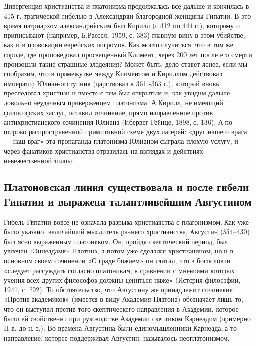 Дивергенция  христианства  и  платонизма  продолжалась  все  дальше  и
кончилась  в  415 г.  трагической  гибелью  в Александрии  благородной
женщины Гипатии. В это время  патриархом александрийским был Кирилл (с
412 по 444  г.), которому и приписывают (например,  Б.Рассел, 1959, с.
383)  главную вину  в  этом  убийстве, как  и  в провокации  еврейских
погромов. Как могло  случиться, что в том же  городе, где проповедовал
просвещенный  Климент,  через  200  лет  после  его  смерти  произошли
такие  страшные злодеяния?  Может  быть, дело  станет  яснее, если  мы
сообразим,  что в  промежутке  между Климентом  и Кириллом  действовал
император Юлиан-отступник  (царствовал в  361 -363 г.),  который вновь
преследовал христиан и вместе с тем был открытым и, как увидим дальше,
довольно  неудачным  приверженцем  платонизма. А  Кирилл,  не  имеющий
философских  заслуг,  оставил  сочинение,  прямо  направленное  против
антихристианского сочинения  Юлиана (Ибервег-Гейнце, 1898, с.  136). А
по  широко  распространенной  примитивной схеме  двух  лагерей:  «друг
нашего врага ---  наш враг» эта пропаганда  платонизма Юлианом сыграла
плохую услугу, и через фанатиков христианства отразилась на взглядах и
действиях невежественной толпы.

\subsection{Платоновская линия  существовала и после гибели  Гипатии и
выражена талантливейшим Августином}

Гибель Гипатии  вовсе не означала разрыва  христианства с платонизмом.
Как  уже  было  указано, величайший  мыслитель  раннего  христианства,
Августин  (354--430)  был  ясно   выраженным  платоником.  Он,  пройдя
скептический  период, был  увлечен  «Эннеадами» Плотина,  а потом  уже
сделался  христианином,  но и  в  основном  своем сочинении  «О  граде
божием»  он  считал, что  в  богословии  «следует рассуждать  согласно
платоникам,  в  сравнении  с   мнениями  которых  учения  всех  других
философов  должны цениться  ниже» (История  философии, 1941,  с. 392).
То  обстоятельство, что  Августину  же  принадлежит сочинение  «Против
академиков» (имеется в виду Академия  Платона) обозначает лишь то, что
он выступал против того  скептического направления в Академии, которое
было  ей  свойственно  при руководстве  Академии  скептиком  Карнеадом
(примерно II в.  до н. з.). Во времена  Августина были единомышленники
Карнеада, а  то направление, которое поддерживал  Августин, называлось
неоплатонизмом.

